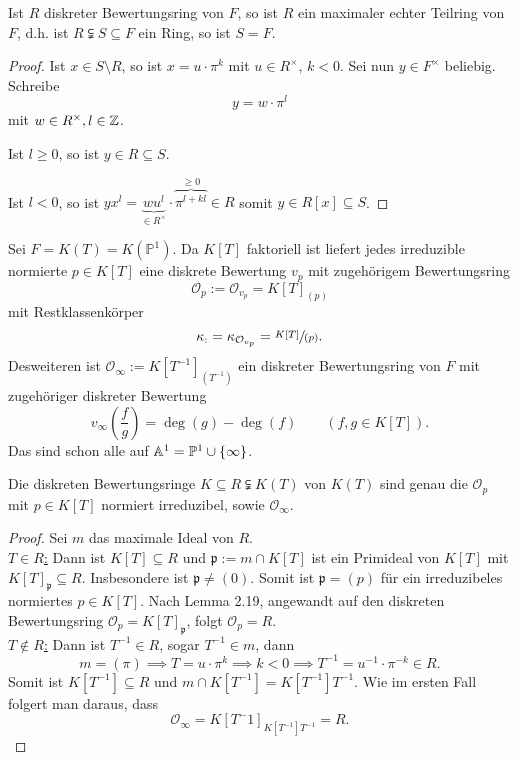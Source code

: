 \begin{lemma}
    Ist $R$ diskreter Bewertungsring von $F$, so ist $R$ ein maximaler echter Teilring von $F$, d.h. ist
    $R \subsetneqq S \subseteq F$ ein Ring, so ist $S = F$.
\end{lemma}
\begin{proof}
    Ist $x \in S \setminus R$, so ist $x = u \cdot \pi^k$ mit $u \in R^\times$, $k< 0$.
    Sei nun $y \in F^\times$ beliebig. Schreibe
    $$ y = w \cdot \pi^l$$
    mit $w \in R^\times, l \in \mathbb{Z}$.

    Ist \underline{$l \geq 0$}, so ist $y \in R \subseteq S$.

    Ist \underline{$l < 0$}, so ist $yx^l=\underbrace{wu^l}_{\in R^\times} \cdot \overbrace{\pi^{l+kl}}^{\geq 0}\in R$
    somit $y \in R[x] \subseteq S$.
\end{proof}

\begin{beispiel}
    Sei $F = K(T) = K(\mathbb{P}^1)$. Da $K[T]$ faktoriell ist liefert jedes irreduzible normierte $p\in K[T]$ eine 
    diskrete Bewertung $v_p$ mit zugehörigem Bewertungsring
    $$ \mathcal{O}_p := \mathcal{O}_{v_p} = K[T]_{(p)}$$
    mit Restklassenkörper
    $$ \kappa_ := \kappa_{\mathcal{O}_{v_p}} = \sfrac{K[T]}{(p)}.$$
    Desweiteren ist $\mathcal{O}_\infty := K[T^{-1}]_{(T^{-1})}$ ein diskreter Bewertungsring von $F$ mit zugehöriger diskreter Bewertung
    $$v_\infty\left(\frac{f}{g}\right) = \deg(g) - \deg(f) \qquad (f,g \in K[T]) .$$
    Das sind schon alle auf $\mathbb{A}^1 = \mathbb{P}^1 \cup \{\infty\}$.
\end{beispiel}

\begin{satz}
    Die diskreten Bewertungsringe $K \subseteq R \subsetneqq K(T)$ von $K(T)$ sind genau die $\mathcal{O}_p$ mit 
    $p \in K[T]$ normiert irreduzibel, sowie $\mathcal{O}_\infty$.
\end{satz}
\begin{proof}
    Sei $m$ das maximale Ideal von $R$.\\
    \underline{$T\in R$:} Dann ist $K[T] \subseteq R$ und $\mathfrak{p} := m \cap K[T]$ ist ein Primideal von $K[T]$ mit
    $K[T]_\mathfrak{p} \subseteq R$. Insbesondere ist $\mathfrak{p} \ne (0)$. Somit ist $\mathfrak{p} = (p)$ für ein irreduzibeles
    normiertes $p \in K[T]$. Nach Lemma 2.19, angewandt auf den diskreten Bewertungsring $\mathcal{O}_p = K[T]_\mathfrak{p}$,
    folgt $\mathcal{O}_p = R$.\\
    \underline{$T\notin R$:} Dann ist $T^{-1} \in R$, sogar $T^{-1} \in m$, dann
    $$m=(\pi) \implies T = u \cdot \pi^k \implies k < 0 \implies T^{-1} = u^{-1}\cdot \pi^{-k} \in R.$$
    Somit ist $K[T^{-1}] \subseteq R$ und $m \cap K[T^{-1}] = K[T^{-1}]T^{-1}$. Wie im ersten Fall folgert man daraus, dass
    $$ \mathcal{O}_\infty = K[T^-1]_{K[T^{-1}]T^{-1}} = R.$$
\end{proof}


